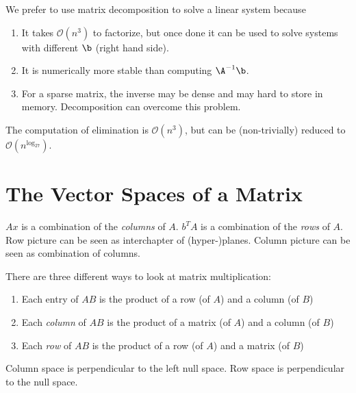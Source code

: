 \begin{rmk}
	We prefer to use matrix decomposition to solve a linear system because
	\begin{enumerate}
		\item It takes $\mathcal{O}(n^3)$ to factorize, but once done it can be used to solve systems with different $\b$ (right hand side).
		\item It is numerically more stable than computing $\A^{-1}\b$.
		\item For a sparse matrix, the inverse may be dense and may hard to store in memory. Decomposition can overcome this problem.
	\end{enumerate}
\end{rmk}


\begin{rmk}
	The computation of elimination is $\mathcal{O}(n^3)$, but can be (non-trivially) reduced to $\mathcal{O}(n^{\log_27})$.
\end{rmk}

\section{The Vector Spaces of a Matrix}
\begin{rmk}
	$Ax$ is a combination of the {\em{columns}} of $A$. $b^TA$ is a combination of the {\em{rows}} of $A$. Row picture can be seen as interchapter of (hyper-)planes. Column picture can be seen as combination of columns.
\end{rmk}

\begin{rmk}
	There are three different ways to look at matrix multiplication:
	\begin{enumerate}
		\item Each entry of $AB$ is the product of a row (of $A$) and a column (of $B$)
		\item Each {\em{column}} of $AB$ is the product of a matrix (of $A$) and a column (of $B$)
		\item Each {\em{row}} of $AB$ is the product of a row (of $A$) and a matrix (of $B$)
	\end{enumerate}
\end{rmk}

\begin{rmk}
	Column space is perpendicular to the left null space. Row space is perpendicular to the null space.
\end{rmk}




